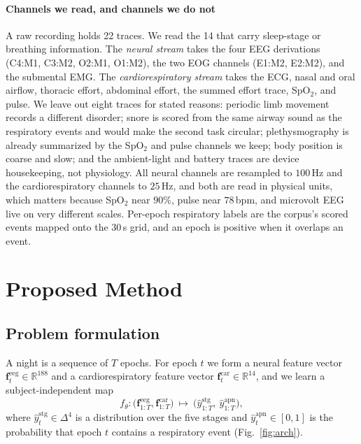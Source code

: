 \documentclass[journal]{IEEEtran}
\begin{document}
\paragraph{Channels we read, and channels we do not}
A raw recording holds 22 traces. We read the 14 that carry sleep-stage or breathing
information. The \emph{neural stream} takes the four EEG derivations (C4:M1, C3:M2, O2:M1,
O1:M2), the two EOG channels (E1:M2, E2:M2), and the submental EMG. The
\emph{cardiorespiratory stream} takes the ECG, nasal and oral airflow, thoracic effort,
abdominal effort, the summed effort trace, SpO$_2$, and pulse. We leave out eight traces for
stated reasons: periodic limb movement records a different disorder; snore is scored from the
same airway sound as the respiratory events and would make the second task circular;
plethysmography is already summarized by the SpO$_2$ and pulse channels we keep; body position
is coarse and slow; and the ambient-light and battery traces are device housekeeping, not
physiology. All neural channels are resampled to $100$\,Hz and the cardiorespiratory channels
to $25$\,Hz, and both are read in physical units, which matters because SpO$_2$ near $90\%$,
pulse near $78$\,bpm, and microvolt EEG live on very different scales. Per-epoch respiratory
labels are the corpus's scored events mapped onto the $30$\,s grid, and an epoch is positive
when it overlaps an event.

\section{Proposed Method}
\label{sec:method}
\subsection{Problem formulation}
A night is a sequence of $T$ epochs. For epoch $t$ we form a neural feature vector
$\mathbf{f}^{\mathrm{eeg}}_t\in\mathbb{R}^{188}$ and a cardiorespiratory feature vector
$\mathbf{f}^{\mathrm{car}}_t\in\mathbb{R}^{14}$, and we learn a subject-independent map
\begin{equation}
f_\theta:\big(\mathbf{f}^{\mathrm{eeg}}_{1:T},\mathbf{f}^{\mathrm{car}}_{1:T}\big)\ \longmapsto\
\big(\hat y^{\mathrm{stg}}_{1:T},\ \hat y^{\mathrm{apn}}_{1:T}\big),
\end{equation}
where $\hat y^{\mathrm{stg}}_t\in\Delta^4$ is a distribution over the five stages and
$\hat y^{\mathrm{apn}}_t\in[0,1]$ is the probability that epoch $t$ contains a respiratory
event (Fig.~\ref{fig:arch}).
\end{document}
